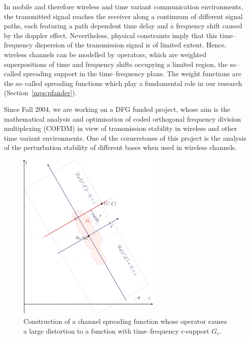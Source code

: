 In mobile and therefore wireless and time variant communication
environments, the transmitted signal reaches the receiver along a
continuum of different signal paths, each featuring a path dependent
time delay and a frequency shift caused by the doppler effect.
Nevertheless, physical constraints imply that this time--frequency
dispersion of the transmission signal is of limited extent. Hence,
wireless channels can be modelled by operators, which are weighted
superpositions of time and frequency shifts occupying a limited
region, the so--called spreading support in the time--frequency
plane. The weight functions are the so--called spreading functions
which play a fundamental role in our research
(Section~\ref{mps:pfander}).

 Since Fall 2004, we are
working on a DFG funded project, whose aim is the mathematical
analysis and optimisation of coded orthogonal frequency division
multiplexing (COFDM) in view of transmission stability in wireless
and other time variant environments. One of the cornerstones of
this project is the analysis of the perturbation stability of
different bases when used in wireless channels.

 \begin{figure}[ht]
   \begin{center}
    \includegraphics[width=7cm]{pfander.png}
     \caption{Construction of a channel spreading function whose operator causes a large distortion to a function
     with time--frequency $\epsilon$-support $G_\epsilon$.}
     \label{fig:pfander}
   \end{center}
 \end{figure}


